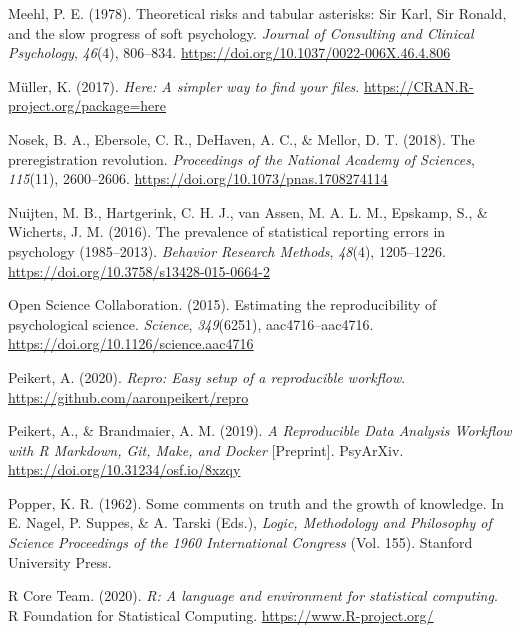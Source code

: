 \documentclass[12pt,a4paper,]{article}
\begin{document}
\leavevmode\hypertarget{ref-meehlTheoreticalRisksTabular1978}{}%
Meehl, P. E. (1978). Theoretical risks and tabular asterisks: Sir Karl, Sir Ronald, and the slow progress of soft psychology. \emph{Journal of Consulting and Clinical Psychology}, \emph{46}(4), 806--834. \url{https://doi.org/10.1037/0022-006X.46.4.806}

\leavevmode\hypertarget{ref-R-here}{}%
Müller, K. (2017). \emph{Here: A simpler way to find your files}. \url{https://CRAN.R-project.org/package=here}

\leavevmode\hypertarget{ref-nosekPreregistrationRevolution2018}{}%
Nosek, B. A., Ebersole, C. R., DeHaven, A. C., \& Mellor, D. T. (2018). The preregistration revolution. \emph{Proceedings of the National Academy of Sciences}, \emph{115}(11), 2600--2606. \url{https://doi.org/10.1073/pnas.1708274114}

\leavevmode\hypertarget{ref-nuijtenPrevalenceStatisticalReporting2016}{}%
Nuijten, M. B., Hartgerink, C. H. J., van Assen, M. A. L. M., Epskamp, S., \& Wicherts, J. M. (2016). The prevalence of statistical reporting errors in psychology (1985--2013). \emph{Behavior Research Methods}, \emph{48}(4), 1205--1226. \url{https://doi.org/10.3758/s13428-015-0664-2}

\leavevmode\hypertarget{ref-opensciencecollaborationEstimatingReproducibilityPsychological2015}{}%
Open Science Collaboration. (2015). Estimating the reproducibility of psychological science. \emph{Science}, \emph{349}(6251), aac4716--aac4716. \url{https://doi.org/10.1126/science.aac4716}

\leavevmode\hypertarget{ref-R-repro}{}%
Peikert, A. (2020). \emph{Repro: Easy setup of a reproducible workflow}. \url{https://github.com/aaronpeikert/repro}

\leavevmode\hypertarget{ref-peikertReproducibleDataAnalysis2019}{}%
Peikert, A., \& Brandmaier, A. M. (2019). \emph{A Reproducible Data Analysis Workflow with R Markdown, Git, Make, and Docker} {[}Preprint{]}. PsyArXiv. \url{https://doi.org/10.31234/osf.io/8xzqy}

\leavevmode\hypertarget{ref-popperCommentsTruthGrowth1962}{}%
Popper, K. R. (1962). Some comments on truth and the growth of knowledge. In E. Nagel, P. Suppes, \& A. Tarski (Eds.), \emph{Logic, Methodology and Philosophy of Science Proceedings of the 1960 International Congress} (Vol. 155). Stanford University Press.

\leavevmode\hypertarget{ref-R-base}{}%
R Core Team. (2020). \emph{R: A language and environment for statistical computing}. R Foundation for Statistical Computing. \url{https://www.R-project.org/}
\end{document}
